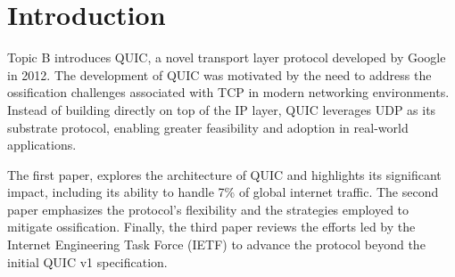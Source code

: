 \section{Introduction}%
\label{sec:Introduction}
Topic B introduces QUIC, a novel transport layer protocol developed by Google in 2012. The development of QUIC was motivated by the need to address the ossification challenges associated with TCP in modern networking environments. Instead of building directly on top of the IP layer, QUIC leverages UDP as its substrate protocol, enabling greater feasibility and adoption in real-world applications.

The first paper, \cite{langley2017quic} explores the architecture of QUIC and highlights its significant impact, including its ability to handle 7\% of global internet traffic. The second paper emphasizes the protocol's flexibility and the strategies employed to mitigate ossification. Finally, the third paper reviews the efforts led by the Internet Engineering Task Force (IETF) to advance the protocol beyond the initial QUIC v1 specification.

